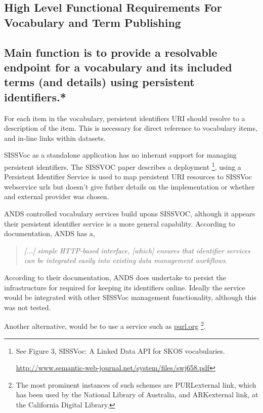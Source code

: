 \documentclass[10pt,a4paper]{article}
\newenvironment{italicquotes}
{\begin{quote}\itshape}
{\end{quote}}
\begin{document}
\begin{flushleft}
\section { 
	High Level Functional Requirements For Vocabulary and Term Publishing
}

  \subsection{
   Main function is to provide a resolvable endpoint for a vocabulary and its
  included terms (and details) using persistent identifiers.* 
  }

  For each item in the vocabulary, persistent identifiers {URI} should
  resolve to a description of the item.  This is necessary for direct reference to
  vocabulary items, and in-line links within datasets.

  \item[SISSVoc] as a standalone application has no inherant support for managing persistent
  identifiers. The SISSVOC paper describes a deployment \footnote{ See Figure 3,
  SISSVoc: A Linked Data API for SKOS vocabularies.

  \url{http://www.semantic-web-journal.net/system/files/swj658.pdf} }, using a
  Persistent Identifier Service is used to map persistent URI resources to SISSVoc
  webservice urls but doesn't give futher details on the implementation or
  whether and external provider was chosen. 

  \item[ANDS] controlled vocabulary services build upons SISSVOC, although it appears
  their persistent identifier service is a more general capability. According to
  documentation, ANDS has a, 

  \begin{italicquotes} [...] simple HTTP-based interface, [which] ensures that
  identifier services can be integrated easily into existing data management
  workflows.  \end{italicquotes}
  According to their documentation, ANDS does undertake to persist the infrastructure for required for
  keeping its identifiers online. Ideally the service would be integrated
  with other SISSVoc management functionality, although this was not tested.

  \item[]Another alternative, would be to use a service such as \url{purl.org}  \footnote{ The most
  prominent instances of such schemes are PURLexternal link, which has been used
  by the National Library of Australia, and ARKexternal link, at the California
  Digital Library.  }. 


\end{flushleft}
\end{document}
